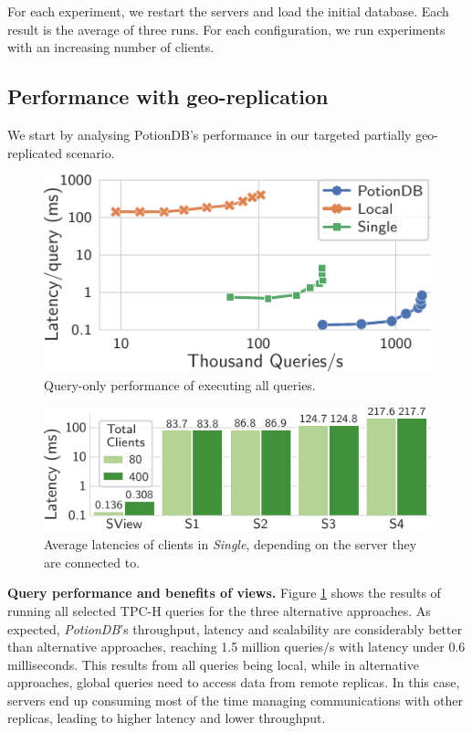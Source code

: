 \documentclass[sigplan,twocolumn,review,anonymous]{acmart}
\begin{document}
For each experiment, we restart the servers and load the initial database. 
Each result is the average of three runs. 
For each configuration, we run experiments with an increasing number of clients. 



\subsection{Performance with geo-replication}

We start by analysing PotionDB's performance in our targeted partially geo-replicated scenario.

\begin{figure}
	\centering
	\includegraphics[width=0.6\linewidth]{singleQuery/all_queries_tc}
	\vspace*{-0.75em}
	\caption{Query-only performance of executing all queries.}
	\label{fig:global_local_single_tc}
	\vspace*{-0.9em}
\end{figure}%
\begin{figure}
	\centering
	\includegraphics[width=0.72\linewidth]{singleQuery/single_TC_latencies}
	\vspace*{-0.6em}
	\caption{Average latencies of clients in \textit{Single}, depending on the server they are connected to.}
	\label{fig:single_tc_latencies}
	\vspace*{-1em}
\end{figure}%

\noindent
\textbf{Query performance and benefits of views.}
Figure \ref{fig:global_local_single_tc} shows the results of running all selected TPC-H queries for the three alternative approaches. 
As expected, \textit{PotionDB}'s throughput, latency and scalability are considerably better than alternative approaches, reaching 
1.5 million queries/s with latency under 0.6 milliseconds. 
This results from all queries being local, while in alternative approaches, global queries need to access data from 
remote replicas. In this case, servers end up consuming most of the time managing communications with other replicas, leading 
to higher latency 
and lower throughput. 
\end{document}
